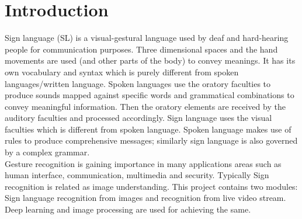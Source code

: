 \chapter{Introduction}
	
\par
Sign language (SL) is a visual-gestural language used by deaf and hard-hearing people for communication purposes. Three dimensional spaces and the hand movements are used (and other parts of the body) to convey meanings. It has its own vocabulary and syntax which is purely different from spoken languages/written language. Spoken languages use the oratory faculties to produce sounds mapped against specific words and
grammatical combinations to convey meaningful information. Then the oratory elements are received by the auditory faculties and processed accordingly. Sign language uses the visual faculties which is different from spoken language. Spoken language makes use of rules to produce comprehensive messages; similarly sign language
is also governed by a complex grammar.\\

Gesture recognition is gaining importance in many applications areas such as human interface, communication, multimedia and security. Typically Sign recognition is related as image understanding. This project contains two modules: Sign language recognition from images and recognition from live video stream. Deep learning and image processing are used for achieving the same. \\




